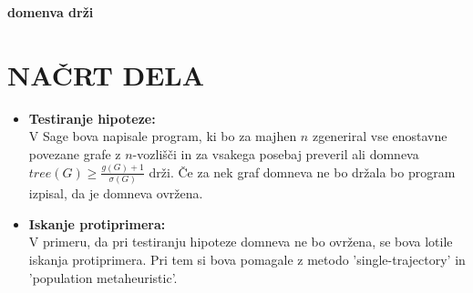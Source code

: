 \documentclass[11pt, a4paper]{article}
\begin{document}
\centering \textbf{ domenva drži}

\newpage
\section{\textbf{NAČRT DELA}}

\begin{itemize}
\item \textbf{Testiranje hipoteze:}\\ V Sage bova napisale program, ki bo za majhen $n$ zgeneriral vse enostavne povezane grafe z $n$-vozlišči in za vsakega posebaj preveril ali domneva $tree(G) \geq \frac{g(G) + 1}{\sigma(G)}$ drži. Če za nek graf domneva ne bo držala bo program izpisal, da je domneva ovržena.
\item \textbf{Iskanje protiprimera:}\\V primeru, da pri testiranju hipoteze domneva ne bo ovržena, se bova lotile iskanja protiprimera. Pri tem si bova  pomagale z  metodo 'single-trajectory' in 'population metaheuristic'.

\end{itemize}
\end{document}
